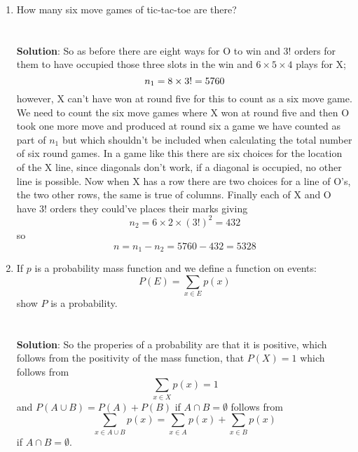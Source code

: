 \documentclass[11pt,a4paper]{scrartcl}
\begin{document}
\begin{enumerate}
\item How many six move games of tic-tac-toe are
  there?\\ \\ \\ \textbf{Solution}: So as before there are eight ways
  for O to win and $3!$ orders for them to have occupied those three
  slots in the win and $6\times 5\times 4$ plays for X;
  \begin{equation}
    n_1=8\times 3! \time 120 =5760
  \end{equation}
  however, X can't have won at round five for this to count as a six
  move game. We need to count the six move games where X won at round
  five and then O took one more move and produced at round six a game
  we have counted as part of $n_1$ but which shouldn't be included
  when calculating the total number of six round games. In a game like
  this there are six choices for the location of the X line, since
  diagonals don't work, if a diagonal is occupied, no other line is
  possible. Now when X has a row there are two choices for a line of
  O's, the two other rows, the same is true of columns. Finally each of X and O have 3! orders they could've places their marks giving
  \begin{equation}
    n_2=6\times 2\times (3!)^2=432
  \end{equation}
  so
  \begin{equation}
    n=n_1-n_2=5760-432=5328
  \end{equation}


\item If $p$ is a probability mass function and we define a function on events:
  \begin{equation}
    P(E)=\sum_{x\in E}p(x)
  \end{equation}
  show $P$ is a probability.\\ \\ \\ \textbf{Solution}: So the
  properies of a probability are that it is positive, which follows
  from the positivity of the mass function, that $P(X)=1$ which
  follows from 
  \begin{equation}
    \sum_{x\in X}p(x)=1
  \end{equation}
  and $P(A\cup B)=P(A)+P(B)$ if $A\cap B=\emptyset$ follows from
    \begin{equation}
    \sum_{x\in A\cup B}p(x)=    \sum_{x\in A}p(x)+    \sum_{x\in B}p(x)
  \end{equation}
  if $A\cap B=\emptyset$.
  
\end{enumerate}
  
\end{document}
